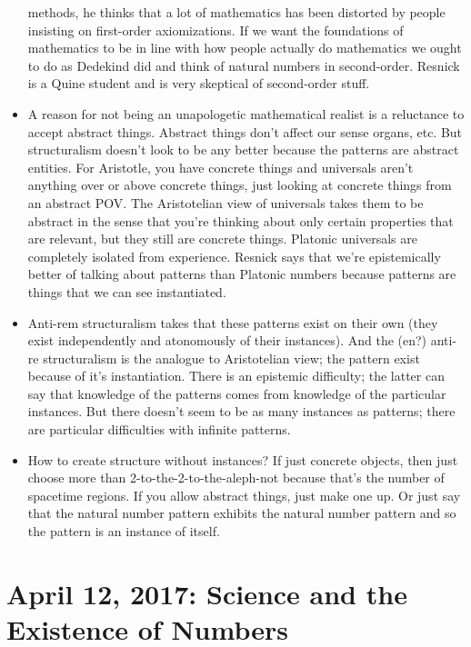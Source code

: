 \documentclass[12pt]{article}
\theoremstyle{definition}
\begin{document}
\begin{itemize}
        methods, he thinks that a lot of mathematics has been distorted by
        people insisting on first-order axiomizations. If we want the
        foundations of mathematics to be in line with how people actually do
        mathematics we ought to do as Dedekind did and think of natural numbers
        in second-order. Resnick is a Quine student and is very skeptical of
        second-order stuff.
    \item
        A reason for not being an unapologetic mathematical realist is a
        reluctance to accept abstract things. Abstract things don't affect our
        sense organs, etc. But structuralism doesn't look to be any better
        because the patterns are abstract entities. For Aristotle, you have
        concrete things and universals aren't anything over or above concrete
        things, just looking at concrete things from an abstract POV. The
        Aristotelian view of universals takes them to be abstract in the sense
        that you're thinking about only certain properties that are relevant,
        but they still are concrete things. Platonic universals are completely
        isolated from experience. Resnick says that we're epistemically better
        of talking about patterns than Platonic numbers because patterns are
        things that we can see instantiated. 
    \item
        Anti-rem structuralism takes that these patterns exist on their own
        (they exist independently and atonomously of their instances). And the
        (en?) anti-re structuralism is the analogue to Aristotelian view; the
        pattern exist because of it's instantiation. There is an epistemic
        difficulty; the latter can say that knowledge of the patterns comes
        from knowledge of the particular instances. But there doesn't seem to
        be as many instances as patterns; there are particular difficulties
        with infinite patterns.
    \item
        How to create structure without instances? If just concrete objects,
        then just choose more than 2-to-the-2-to-the-aleph-not  because that's
        the number of spacetime regions. If you allow abstract things, just
        make one up. Or just say that the natural number pattern exhibits the
        natural number pattern and so the pattern is an instance of itself.
\end{itemize}

\section{April 12, 2017: Science and the Existence of Numbers}
\end{document}
